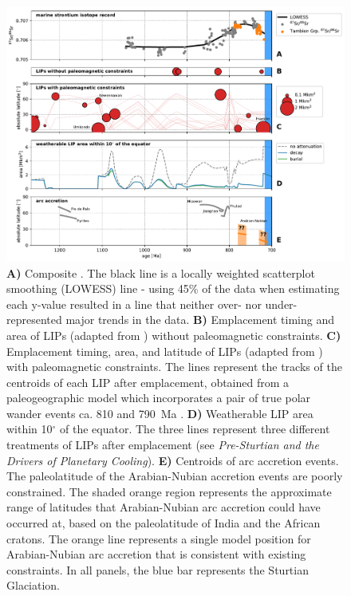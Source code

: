 \begin{figure}[h!]
\begin{center}
	\includegraphics[width=\textwidth]{figures/Tambien/SrSr-LIPs.pdf}
	\caption[Tonian \SrSr and large igneous provinces.]{\textbf{A)} Composite \SrSr. The black line is a locally weighted scatterplot smoothing (LOWESS) line - using 45\% of the data when estimating each y-value resulted in a line that neither over- nor under-represented major trends in the \SrSr data. \textbf{B)} Emplacement timing and area of LIPs (adapted from \citealp{Ernst2017a}) without paleomagnetic constraints. \textbf{C)} Emplacement timing, area, and latitude of LIPs (adapted from \citealp{Ernst2017a}) with paleomagnetic constraints. The lines represent the tracks of the centroids of each LIP after emplacement, obtained from a paleogeographic model \citep{Swanson-Hysell2019a} which incorporates a pair of true polar wander events ca. 810 and 790~Ma \citep{Maloof2010a, Swanson-Hysell2012a}. \textbf{D)} Weatherable LIP area within 10$^{\circ}$ of the equator. The three lines represent three different treatments of LIPs after emplacement (see \textit{Pre-Sturtian \SrSr and the Drivers of Planetary Cooling}). \textbf{E)} Centroids of arc accretion events. The paleolatitude of the Arabian-Nubian accretion events are poorly constrained. The shaded orange region represents the approximate range of latitudes that Arabian-Nubian arc accretion could have occurred at, based on the paleolatitude of India and the African cratons. The orange line represents a single model position for Arabian-Nubian arc accretion that is consistent with existing constraints. In all panels, the blue bar represents the Sturtian Glaciation.}
	\label{fig:SrSr-LIPs}
\end{center}
\end{figure}

